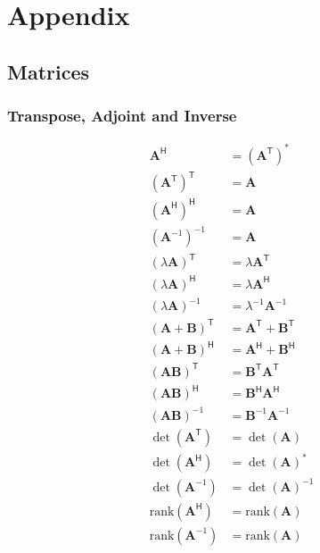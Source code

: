 \section{Appendix}
\subsection{Matrices}
\subsubsection{Transpose, Adjoint and Inverse}
\noindent\begin{align*}
    \mathbf{A}^\mathsf{H}                  & = {(\mathbf{A}^\mathsf{T})}^*                   \\[.75em]
    {({\mathbf{A}}^\mathsf{T})}^\mathsf{T} & = \mathbf{A}                                    \\
    {({\mathbf{A}}^\mathsf{H})}^\mathsf{H} & = \mathbf{A}                                    \\
    {({\mathbf{A}}^{-1})}^{-1}             & = \mathbf{A}                                    \\[.75em]
    {(\lambda\mathbf{A})}^\mathsf{T}       & = \lambda\mathbf{A}^\mathsf{T}                  \\
    {(\lambda\mathbf{A})}^\mathsf{H}       & = \lambda\mathbf{A}^\mathsf{H}                  \\
    {(\lambda\mathbf{A})}^{-1}             & = \lambda^{-1}\mathbf{A}^{-1}                   \\[.75em]
    {(\mathbf{A}+\mathbf{B})}^\mathsf{T}   & = \mathbf{A}^\mathsf{T} + \mathbf{B}^\mathsf{T} \\
    {(\mathbf{A}+\mathbf{B})}^\mathsf{H}   & = \mathbf{A}^\mathsf{H} + \mathbf{B}^\mathsf{H} \\[.75em]
    {(\mathbf{A}\mathbf{B})}^\mathsf{T}    & = \mathbf{B}^\mathsf{T}\mathbf{A}^\mathsf{T}    \\
    {(\mathbf{A}\mathbf{B})}^\mathsf{H}    & = \mathbf{B}^\mathsf{H}\mathbf{A}^\mathsf{H}    \\
    {(\mathbf{A}\mathbf{B})}^{-1}          & = \mathbf{B}^{-1} \mathbf{A}^{-1}               \\[.75em]
    \det(\mathbf{A}^\mathsf{T})            & = \det(\mathbf{A})                              \\
    \det(\mathbf{A}^\mathsf{H})            & = {\det(\mathbf{A})}^*                          \\
    \det(\mathbf{A}^{-1})                  & = {\det(\mathbf{A})}^{-1}                       \\[.75em]
    \mathrm{rank}{(\mathbf{A}^\mathsf{H})} & = \mathrm{rank}(\mathbf{A})                     \\
    \mathrm{rank}{(\mathbf{A}^{-1} )}      & = \mathrm{rank}(\mathbf{A})
\end{align*}

